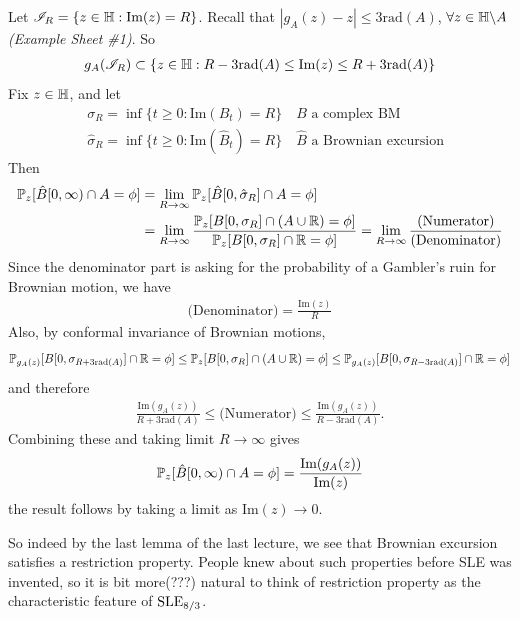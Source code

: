 \documentclass[12pt,a4paper]{article}
\newenvironment{proof}
{\begin{changemargin}{0.5cm}{0.5cm} 
	}%
	{\end{changemargin}
}
\newenvironment{p}
{\begin{proof} 
	}%
	{\end{proof}
}
\begin{document}
\begin{p}
\pf Let $\mathscr{I}_R = \{z\in \mathbb{H} : \text{Im}(z) = R \}$. Recall that $|g_A(z)- z| \leq 3 \text{rad}(A)$, $\forall z\in \mathbb{H} \backslash A$ \emph{(Example Sheet \#1)}. So 
\begin{align*}
g_A(\mathscr{I}_R) \subset \{z\in \mathbb{H} : R- 3\text{rad}(A) \leq \text{Im}(z) \leq R+ 3\text{rad}(A)\}
\end{align*}
Fix $z\in \mathbb{H}$, and let
\begin{align*}
&\sigma_R = \inf \{t\geq 0 : \text{Im}(B_t) = R \}\quad B\text{ a complex BM} \\
&\hat{\sigma}_R = \inf \{t\geq 0 : \text{Im}(\hat{B}_t) = R \} \quad \hat{B} \text{ a Brownian excursion}
\end{align*}
Then
\begin{align*}
\mathbb{P}_z [\hat{B}[0, \infty) \cap A = \phi] &= \lim_{R\rightarrow \infty} \mathbb{P}_z [\hat{B}[0, \hat{\sigma}_R]\cap A = \phi] \\
&=\lim_{R\rightarrow \infty} \frac{\mathbb{P}_z [B[0, \sigma_R] \cap (A\cup \mathbb{R}) = \phi]}{\mathbb{P}_z [B[0, \sigma_R] \cap \mathbb{R} = \phi]} = \lim_{R\rightarrow \infty} \frac{\text{(Numerator)}}{\text{(Denominator)}}
\end{align*}
Since the denominator part is asking for the probability of a Gambler's ruin for Brownian motion, we have
\begin{align*}
\text{(Denominator)} = \frac{\text{Im}(z)}{R}
\end{align*}
Also, by conformal invariance of Brownian motions,
\begin{align*}
\mathbb{P}_{g_A(z)}[B[0, \sigma_{R+ 3\text{rad}(A)}]\cap \mathbb{R} =\phi ] \leq  \mathbb{P}_z [B[0, \sigma_R] \cap (A\cup \mathbb{R}) = \phi] \leq \mathbb{P}_{g_A(z)} [B[0, \sigma_{R- 3\text{rad}(A)}]\cap \mathbb{R} = \phi]
\end{align*}
and therefore
\begin{align*}
\frac{\text{Im}(g_A(z))}{R+3\text{rad}(A)} \leq \text{(Numerator)} \leq \frac{\text{Im}(g_A(z))}{R-3\text{rad}(A)}.
\end{align*}
Combining these and taking limit $R\rightarrow \infty$ gives
\begin{align*}
\mathbb{P}_z [\hat{B}[0, \infty) \cap A =\phi] = \frac{\text{Im}(g_A(z))}{\text{Im}(z)}
\end{align*}
the result follows by taking a limit as $\text{Im}(z) \rightarrow 0$.

\eop
\end{p}
\s

So indeed by the last lemma of the last lecture, we see that Brownian excursion satisfies a restriction property. People knew about such properties before SLE was invented, so it is bit more(???) natural to think of restriction property as the characteristic feature of $\text{SLE}_{8/3}$.
\s
\end{document}
